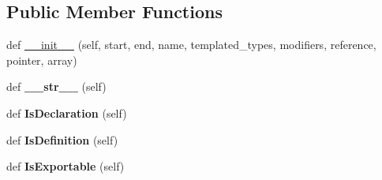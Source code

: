 \subsection*{Public Member Functions}
\begin{DoxyCompactItemize}
\item 
def \hyperlink{classcpp_1_1ast_1_1Type_adc20d88db721b5d7b513c08a4d6753c9}{\+\_\+\+\_\+init\+\_\+\+\_\+} (self, start, end, name, templated\+\_\+types, modifiers, reference, pointer, array)
\item 
def {\bfseries \+\_\+\+\_\+str\+\_\+\+\_\+} (self)\hypertarget{classcpp_1_1ast_1_1Type_a1a10eff21f6150b7e14bde3788fa069b}{}\label{classcpp_1_1ast_1_1Type_a1a10eff21f6150b7e14bde3788fa069b}

\item 
def {\bfseries Is\+Declaration} (self)\hypertarget{classcpp_1_1ast_1_1Type_a590071a2bce7ea5140d7eb86c90f63bf}{}\label{classcpp_1_1ast_1_1Type_a590071a2bce7ea5140d7eb86c90f63bf}

\item 
def {\bfseries Is\+Definition} (self)\hypertarget{classcpp_1_1ast_1_1Type_aedff25dc3736e83388742e55fe29159b}{}\label{classcpp_1_1ast_1_1Type_aedff25dc3736e83388742e55fe29159b}

\item 
def {\bfseries Is\+Exportable} (self)\hypertarget{classcpp_1_1ast_1_1Type_a80dce781581c03e550ce51a9a33ca158}{}\label{classcpp_1_1ast_1_1Type_a80dce781581c03e550ce51a9a33ca158}

\end{DoxyCompactItemize}
